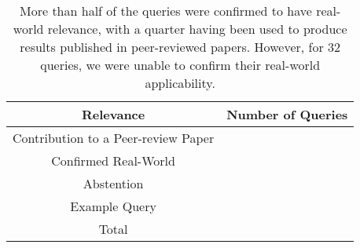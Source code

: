 \begin{table}
    \begin{center}
        \begin{tabular}{|c|c|}
            \hline
            Relevance & Number of Queries \\
            \hline\hline
            Contribution to a Peer-review Paper & {} \\
            \hline
            Confirmed Real-World                & {} \\
            \hline
            Abstention                          & {} \\
            \hline
            Example Query                       & {} \\
            \hline\hline
            Total                               & {} \\
            \hline
        \end{tabular}
    \end{center}
    \caption{
            More than half of the queries were confirmed to have real-world relevance, with a quarter having been used to produce results published in peer-reviewed papers.
            However, for 32 queries, we were unable to confirm their real-world applicability.
        }
    \label{tab:queryRelevance}
\end{table}   